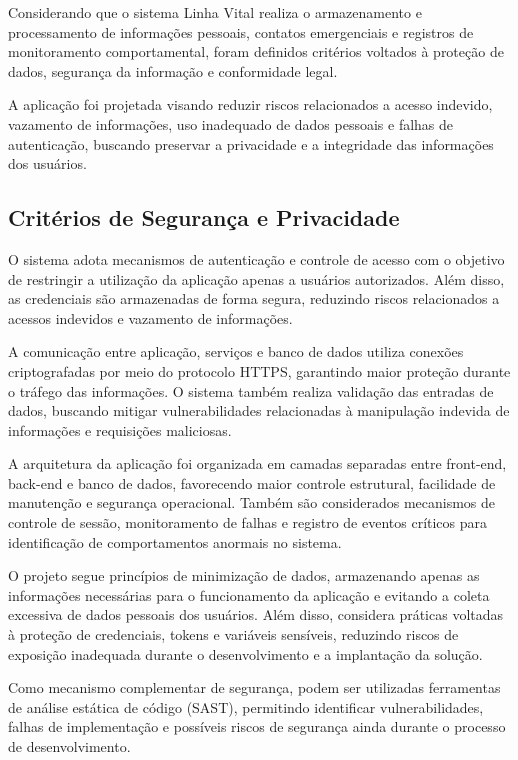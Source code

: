 Considerando que o sistema Linha Vital realiza o armazenamento e processamento de informações pessoais, contatos emergenciais e registros de monitoramento comportamental, foram definidos critérios voltados à proteção de dados, segurança da informação e conformidade legal.

A aplicação foi projetada visando reduzir riscos relacionados a acesso indevido, vazamento de informações, uso inadequado de dados pessoais e falhas de autenticação, buscando preservar a privacidade e a integridade das informações dos usuários.

\subsection{Critérios de Segurança e Privacidade}

O sistema adota mecanismos de autenticação e controle de acesso com o objetivo de restringir a utilização da aplicação apenas a usuários autorizados. Além disso, as credenciais são armazenadas de forma segura, reduzindo riscos relacionados a acessos indevidos e vazamento de informações.

A comunicação entre aplicação, serviços e banco de dados utiliza conexões criptografadas por meio do protocolo HTTPS, garantindo maior proteção durante o tráfego das informações. O sistema também realiza validação das entradas de dados, buscando mitigar vulnerabilidades relacionadas à manipulação indevida de informações e requisições maliciosas.

A arquitetura da aplicação foi organizada em camadas separadas entre front-end, back-end e banco de dados, favorecendo maior controle estrutural, facilidade de manutenção e segurança operacional. Também são considerados mecanismos de controle de sessão, monitoramento de falhas e registro de eventos críticos para identificação de comportamentos anormais no sistema.

O projeto segue princípios de minimização de dados, armazenando apenas as informações necessárias para o funcionamento da aplicação e evitando a coleta excessiva de dados pessoais dos usuários. Além disso, considera práticas voltadas à proteção de credenciais, tokens e variáveis sensíveis, reduzindo riscos de exposição inadequada durante o desenvolvimento e a implantação da solução.

Como mecanismo complementar de segurança, podem ser utilizadas ferramentas de análise estática de código (SAST), permitindo identificar vulnerabilidades, falhas de implementação e possíveis riscos de segurança ainda durante o processo de desenvolvimento.

